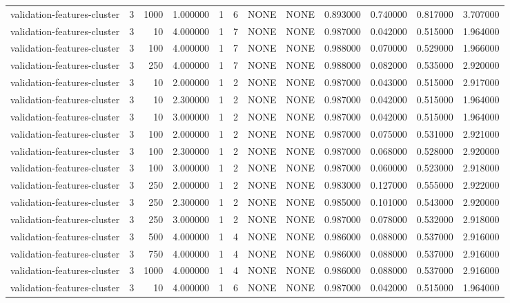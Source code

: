 \begin{tabular}{lrrrllllrrrr}
validation-features-cluster & 3 & 1000 & 1.000000 & 1 & 6 & NONE & NONE & 0.893000 & 0.740000 & 0.817000 & 3.707000 \\
validation-features-cluster & 3 & 10 & 4.000000 & 1 & 7 & NONE & NONE & 0.987000 & 0.042000 & 0.515000 & 1.964000 \\
validation-features-cluster & 3 & 100 & 4.000000 & 1 & 7 & NONE & NONE & 0.988000 & 0.070000 & 0.529000 & 1.966000 \\
validation-features-cluster & 3 & 250 & 4.000000 & 1 & 7 & NONE & NONE & 0.988000 & 0.082000 & 0.535000 & 2.920000 \\
validation-features-cluster & 3 & 10 & 2.000000 & 1 & 2 & NONE & NONE & 0.987000 & 0.043000 & 0.515000 & 2.917000 \\
validation-features-cluster & 3 & 10 & 2.300000 & 1 & 2 & NONE & NONE & 0.987000 & 0.042000 & 0.515000 & 1.964000 \\
validation-features-cluster & 3 & 10 & 3.000000 & 1 & 2 & NONE & NONE & 0.987000 & 0.042000 & 0.515000 & 1.964000 \\
validation-features-cluster & 3 & 100 & 2.000000 & 1 & 2 & NONE & NONE & 0.987000 & 0.075000 & 0.531000 & 2.921000 \\
validation-features-cluster & 3 & 100 & 2.300000 & 1 & 2 & NONE & NONE & 0.987000 & 0.068000 & 0.528000 & 2.920000 \\
validation-features-cluster & 3 & 100 & 3.000000 & 1 & 2 & NONE & NONE & 0.987000 & 0.060000 & 0.523000 & 2.918000 \\
validation-features-cluster & 3 & 250 & 2.000000 & 1 & 2 & NONE & NONE & 0.983000 & 0.127000 & 0.555000 & 2.922000 \\
validation-features-cluster & 3 & 250 & 2.300000 & 1 & 2 & NONE & NONE & 0.985000 & 0.101000 & 0.543000 & 2.920000 \\
validation-features-cluster & 3 & 250 & 3.000000 & 1 & 2 & NONE & NONE & 0.987000 & 0.078000 & 0.532000 & 2.918000 \\
validation-features-cluster & 3 & 500 & 4.000000 & 1 & 4 & NONE & NONE & 0.986000 & 0.088000 & 0.537000 & 2.916000 \\
validation-features-cluster & 3 & 750 & 4.000000 & 1 & 4 & NONE & NONE & 0.986000 & 0.088000 & 0.537000 & 2.916000 \\
validation-features-cluster & 3 & 1000 & 4.000000 & 1 & 4 & NONE & NONE & 0.986000 & 0.088000 & 0.537000 & 2.916000 \\
validation-features-cluster & 3 & 10 & 4.000000 & 1 & 6 & NONE & NONE & 0.987000 & 0.042000 & 0.515000 & 1.964000 \\

\end{tabular}
